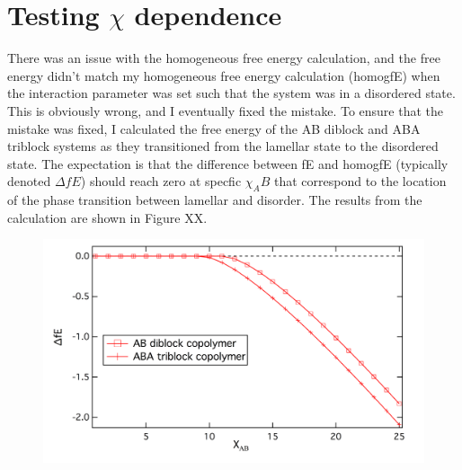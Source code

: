 \documentclass[11pt]{article} %
\begin{document}
\section{Testing $\chi$ dependence}

There was an issue with the homogeneous free energy calculation, and the free energy didn't match my homogeneous free energy calculation (homogfE) when the interaction parameter was set such that the system was in a disordered state. This is obviously wrong, and I eventually fixed the mistake. To ensure that the mistake was fixed, I calculated the free energy of the AB diblock and ABA triblock systems as they transitioned from the lamellar state to the disordered state. The expectation is that the difference between fE and homogfE (typically denoted $\Delta fE$) should reach zero at specfic $\chi_AB$ that correspond to the location of the phase transition between lamellar and disorder. The results from the calculation are shown in Figure XX.

\begin{figure}[H]
\centering
\includegraphics[scale=0.7]{chi_conv}
\centering
\end{figure}
\end{document}
